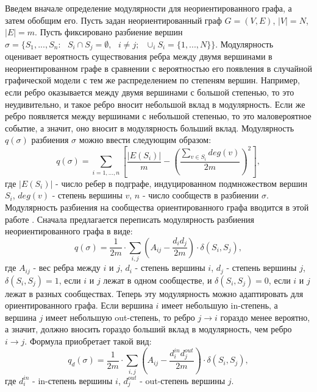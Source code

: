 Введем вначале определение модулярности для неориентированного графа, а затем обобщим его. Пусть задан неориентированный граф $G=(V,E)$, $|V|=N$, $|E|=m$. Пусть фиксировано разбиение вершин  $\sigma=\{S_1,...,S_n:\textbf{ }S_i\cap S_j=\emptyset,\textbf{ }i\neq j;\textbf{ }\cup_i S_i=\{1,...,N\}\}$. Модулярность оценивает вероятность существования ребра между двумя вершинами в неориентированном графе в сравнении с вероятностью его появления в случайной графической модели с тем же распределением по степеням вершин. Например, если ребро оказывается между двумя вершинами с большой степенью, то это неудивительно, и такое ребро вносит небольшой вклад в модулярность. Если же ребро появляется между вершинами с небольшой степенью, то это маловероятное событие, а значит, оно вносит в модулярность больший вклад. Модулярность $q(\sigma)$ разбиения $\sigma$ можно ввести следующим образом:
\begin{equation}
q(\sigma)=\sum_{i=1,\dots,n} [\frac{|E(S_i)|}{m}-(\frac{\sum_{v\in S_i} deg(v)}{2m})^2],
\end{equation}
где $|E(S_i)|$ - число ребер в подграфе, индуцированном подмножеством вершин $S_i$, $deg(v)$ - степень вершины $v$, $n$ - число сообществ в разбиении $\sigma$.\\

Модулярность разбиения на сообщества ориентированного графа вводится в этой работе \cite{louvain}. Сначала предлагается переписать модулярность разбиения неориентированного графа в виде:
\begin{equation}
q(\sigma) = \frac{1}{2m}\cdot \sum_{i,j} (A_{ij}-\frac{d_id_j}{2m})\cdot\delta(S_i, S_j),
\end{equation}
где $A_{ij}$ - вес ребра между $i$ и $j$, $d_i$ - степень вершины $i$, $d_j$ - степень вершины $j$, $\delta(S_i, S_j)=1$, если $i$ и $j$ лежат в одном сообществе, и $\delta(S_i, S_j)=0$, если $i$ и $j$ лежат в разных сообществах. Теперь эту модулярность можно адаптировать для ориентированного графа. Если вершина $i$ имеет небольшую in-степень, а вершина $j$ имеет небольшую out-степень, то ребро $j \rightarrow i$ гораздо менее вероятно, а значит, должно вносить гораздо больший вклад в модулярность, чем ребро $i \rightarrow j$. Формула приобретает такой вид:
\begin{equation}
q_d(\sigma) = \frac{1}{2m}\cdot \sum_{i,j} (A_{ij}-\frac{d_i^{in}d_j^{out}}{2m})\cdot\delta(S_i, S_j),
\end{equation}
где $d_i^{in}$ - in-степень вершины $i$, $d_j^{out}$ - out-степень вершины $j$.\\

